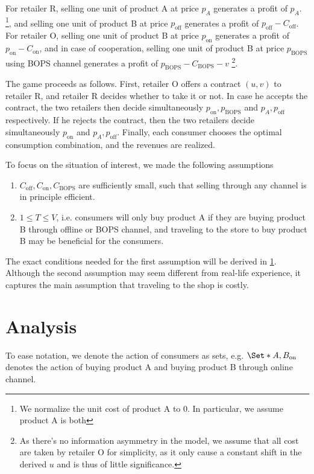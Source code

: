 \documentclass[a4paper]{article}
\theoremstyle{definition}
\theoremstyle{plain}
\theoremstyle{remark}
\newcommand{\on}{\mathrm{on}}
\newcommand{\off}{\mathrm{off}}
\newcommand{\BOPS}{\mathrm{BOPS}}
\begin{document}
For retailer R,
selling one unit of product A at price $p_A$ generates a profit of $p_A$.
\footnote{We normalize the unit cost of product A to 0.
In particular,
we assume product A is both},
and selling one unit of product B at price $p_{\off}$ generates a profit of $p_{\off}-C_{\off}$.
For retailer O,
selling one unit of product B at price $p_{\on}$ generates a profit of $p_{\on}-C_{\on}$,
and in case of cooperation,
selling one unit of product B at price $p_{\BOPS}$ using BOPS channel generates a profit of $p_{\BOPS}-C_{\BOPS}-v$%
\footnote{As there's no information asymmetry in the model,
    we assume that all cost are taken by retailer O for simplicity,
    as it only cause a constant shift in the derived $u$ and is thus of little significance.}.

The game proceeds as follows.
First,
retailer O offers a contract $(u,v)$ to retailer R,
and retailer R decides whether to take it or not.
In case he accepts the contract,
the two retailers then decide simultaneously $p_{\on},p_{\BOPS}$ and $p_A,p_{\off}$ respectively.
If he rejects the contract,
then the two retailers decide simultaneously $p_{\on}$ and $p_A,p_{\off}$.
Finally,
each consumer chooses the optimal consumption combination,
and the revenues are realized.

To focus on the situation of interest,
we made the following assumptions
\begin{enumerate}
    \item $C_{\off},C_{\on},C_{\BOPS}$ are sufficiently small,
          such that selling through any channel is in principle efficient.
    \item $1\leq T\leq V$,
          i.e. consumers will only buy product A if they are buying product B through offline or BOPS channel,
          and traveling to the store to buy product B may be beneficial for the consumers.
\end{enumerate}
The exact conditions needed for the first assumption will be derived in \cref{sec:analysis}.
Although the second assumption may seem different from real-life experience,
it captures the main assumption that traveling to the shop is costly.

\section{Analysis}\label{sec:analysis}
To ease notation,
we denote the action of consumers as sets,
e.g. $\Set*{A,B_{\on}}$ denotes the action of buying product A and buying product B through online channel.
\end{document}
